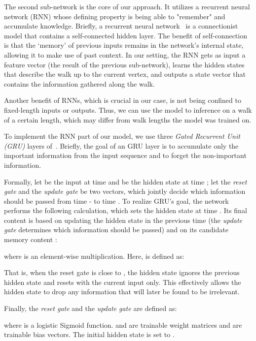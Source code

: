 \documentclass[acmtog]{acmart}
\begin{document}
The second sub-network is the core of our approach.
It utilizes a recurrent neural network (RNN) whose defining property is being able to "remember" and accumulate knowledge.
Briefly, a recurrent neural network~\cite{graves2008novel,hochreiter1997long,cho2014learning} is a  connectionist model that contains a self-connected hidden layer. 
The benefit of self-connection is that the ‘memory’ of previous inputs remains in the network’s internal state, allowing it to make use of past context.
In our setting, the RNN gets as input a feature vector  (the result of the previous sub-network), learns the hidden states that describe the walk up to the current vertex, and outputs a state vector that contains the  information gathered along the walk. 

Another benefit of RNNs, which is crucial in our case, is not being confined to fixed-length inputs or outputs.
Thus, we can use the model to inference on a walk of a certain length, which may differ from walk lengths the model was trained on.

To implement the RNN part of our model, we use three {\em Gated Recurrent Unit (GRU)} layers of~\cite{cho2014learning}.
Briefly, the goal of an GRU layer is to accumulate only the important information from the input sequence and to forget the non-important information.

Formally, let  be the input at time  and  be the hidden state at time ;
let the {\em reset gate}  and the {\em update gate}  be two vectors, which jointly decide which information should be passed from time - to time .
To realize GRU's goal, the network performs the following calculation, which sets the hidden state at time .
Its final content is based on updating the hidden state in the previous time (the {\em update gate}  determines which information should be passed) and on its candidate memory content :

where  is an element-wise multiplication.
Here,  is defined as:

That is, when the reset gate is close to , the hidden state ignores the previous hidden state and resets with the current input only.
This effectively allows the hidden state to drop any information that will later be found to be irrelevant.

Finally,  the {\em reset gate}  and the {\em update gate}  are defined as:


where  is a logistic Sigmoid function. 
 and  are trainable weight matrices and   are trainable bias vectors.
The initial hidden state  is set to .
\end{document}
